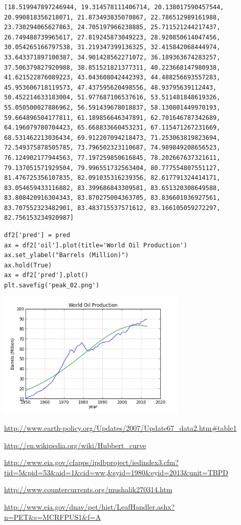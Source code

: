 \documentclass[12pt,fleqn]{article}\usepackage{../common}
\begin{document}
\begin{verbatim}
[18.519947897246944, 19.314578111406714, 20.138017590457544, 20.990818356218071, 21.873493835070867, 22.786512989161988, 23.730294065627863, 24.705197966238885, 25.711521244217437, 26.749488739965617, 27.819245873049223, 28.920850614047456, 30.054265166797538, 31.219347399136325, 32.415842068444974, 33.643371897100387, 34.901428562271072, 36.189363674283257, 37.506379827920988, 38.851521821377311, 40.223668147980938, 41.621522876089223, 43.043608042442393, 44.488256693557283, 45.953606718119573, 47.437595620498556, 48.93795639112443, 50.452214633183004, 51.977687106537616, 53.511481848619326, 55.050500027886962, 56.591439678018837, 58.130801449970193, 59.664896504177811, 61.189856646347891, 62.701646787342689, 64.196079780704423, 65.668833660453231, 67.115471267231669, 68.531462213036434, 69.912207094218473, 71.253063819823694, 72.549375878505785, 73.796502323110687, 74.989849208656523, 76.124902177944563, 77.197259850616845, 78.202667637321611, 79.137051571929504, 79.996551732563404, 80.777554807551127, 81.476725356107835, 82.091035316239356, 82.617791324414171, 83.054659433116882, 83.399686843309581, 83.651320308649588, 83.808420916304343, 83.870275004363705, 83.836601036927561, 83.707552323482901, 83.483715537571612, 83.166105059272297, 82.756153234920987]
\end{verbatim}

\begin{verbatim}
df2['pred'] = pred
ax = df2['oil'].plot(title='World Oil Production')
ax.set_ylabel("Barrels (Million)")
ax.hold(True)
ax = df2['pred'].plot()
plt.savefig('peak_02.png')
\end{verbatim}

\includegraphics[height=6cm]{peak_02.png}


\url{http://www.earth-policy.org/Updates/2007/Update67_data2.htm#table1}

\url{http://en.wikipedia.org/wiki/Hubbert_curve}

\url{http://www.eia.gov/cfapps/ipdbproject/iedindex3.cfm?tid=5&pid=53&aid=1&cid=ww,&syid=1980&eyid=2013&unit=TBPD}

\url{http://www.countercurrents.org/mushalik270314.htm}

\url{http://www.eia.gov/dnav/pet/hist/LeafHandler.ashx?n=PET&s=MCRFPUS1&f=A}
\end{document}
